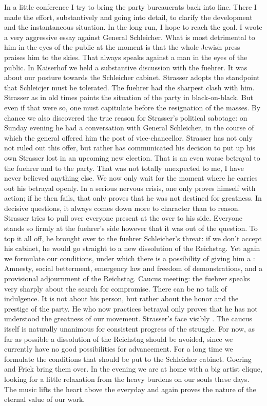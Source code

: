 In a little conference I try to bring the party bureaucrats back into line. There I made the effort, substantively and going into detail, to clarify the development and the instantaneous situation. In the long run, I hope to reach the goal. I wrote a very aggressive essay against General Schleicher. What is most detrimental to him in the eyes of the public at the moment is that the whole Jewish press praises him to the skies. That always speaks against a man in the eyes of the public. In Kaiserhof we held a substantive discussion with the fuehrer. It was about our posture towards the Schleicher cabinet. Strasser adopts the standpoint that Schleicjer must be tolerated. The fuehrer had the sharpest clash with him. Strasser as in old times paints the situation of the party in black-on-black. But even if that were so, one must capitulate before the resignation of the masses. By chance we also discovered the true reason for Strasser's political sabotage: on Sunday evening he had a conversation with General Schleicher, in the course of which the general offered him the post of vice-chancellor. Strasser has not only not ruled out this offer, but rather has communicated his decision to put up his own Strasser lost in an upcoming new election. That is an even worse betrayal to the fuehrer and to the party. That was not totally unexpected to me, I have never believed anything else. We now only wait for the moment where he carries out his betrayal openly. In a serious nervous crisis, one only proves himself with action; if he then fails, that only proves that he was not destined for greatness. In decisive questions, it always comes down more to character than to reason. Strasser tries to pull over everyone present at the  over to his side. Everyone stands so firmly at the fuehrer's side however that it was out of the question. To top it all off, he brought over to the fuehrer Schleicher's threat: if we don't accept his cabinet, he would go straight to a new dissolution of the Reichstag. Yet again we formulate our conditions, under which there is a possibility of giving him a : Amnesty, social betterment, emergency law and freedom of demonstrations, and a provisional adjournment of the Reichstag. Caucus meeting: the fuehrer speaks very sharply about the search for compromise. There can be no talk of indulgence. It is not about his person, but rather about the honor and the prestige of the party. He who now practices betrayal only proves that he has not understood the greatness of our movement. Strasser's face visibly . The caucus itself is naturally unanimous for consistent progress of the struggle. 
For now, as far as possible a dissolution of the Reichstag should be avoided, since we currently have no good possibilities for advancement. For a long time we formulate the conditions that should be put to the Schleicher cabinet. Goering and Frick bring them over. In the evening we are at home with a big artist clique, looking for a little relaxation from the heavy burdens on our souls these days. The music lifts the heart above the everyday and again proves the nature of the eternal value of our work.

